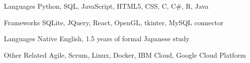 

\begin{cvskills}

  \cvskill
    {Languages} %
    {Python, SQL, JavaScript, HTML5, CSS, C, C\#, R, Java} %

  \cvskill
    {Frameworks} %
    {SQLite, JQuery, React, OpenGL, tkinter, MySQL connector} %

  \cvskill
    {Languages} %
    {Native English, 1.5 years of formal Japanese study} %

  \cvskill
    {Other Related} %
    {Agile, Scrum, Linux, Docker, IBM Cloud, Google Cloud Platform} %

\end{cvskills}
